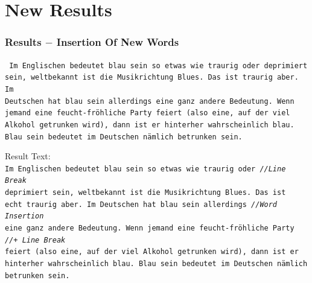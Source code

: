 \documentclass{beamer}
\begin{document}
\section{New Results}

\begin{frame}
\frametitle{Results $-$ Insertion Of New Words}
\texttt{\tiny
Im Englischen bedeutet blau sein so etwas wie traurig oder deprimiert \\
sein, weltbekannt ist die Musikrichtung Blues. Das ist traurig aber. Im \\
Deutschen hat blau sein allerdings eine ganz andere Bedeutung. Wenn \\
jemand eine feucht-fröhliche Party feiert (also eine, auf der viel \\
Alkohol getrunken wird), dann ist er hinterher wahrscheinlich blau. \\
Blau sein bedeutet im Deutschen nämlich betrunken sein. \\
}

Result Text: \\

\texttt{\scriptsize{I}\tiny m Englischen bedeutet blau sein so etwas wie traurig oder \hskip 58pt \emph{//Line Break} \\
\scriptsize{d}\tiny eprimiert sein, weltbekannt ist die Musikrichtung Blues. Das ist \\
\scriptsize{e}\tiny cht traurig aber. Im Deutschen hat blau sein allerdings \hskip 60pt \emph{//Word Insertion}\\
\scriptsize{e}\tiny ine ganz andere Bedeutung. Wenn jemand eine feucht-fröhliche Party \hskip 30pt \emph{//+ Line Break}\\
feiert (also eine, auf der viel Alkohol getrunken wird), dann ist er \\
hinterher wahrscheinlich blau. Blau sein bedeutet im Deutschen nämlich \\
betrunken sein. \\
}
\end{frame}
\end{document}
